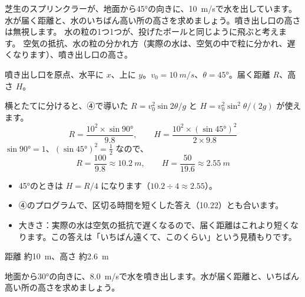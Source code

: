 \begin{phreidai}[スプリンクラーの水]
\label{ph:力-1:ex6}芝生のスプリンクラーが、地面から45°の向きに、\qty{10}{m/s}で水を出しています。水が届く距離と、水のいちばん高い所の高さを求めましょう。噴き出し口の高さは無視します。
\phbamen
水の粒の1つ1つが、投げたボールと同じように飛ぶと考えます。
\phmushi
空気の抵抗、水の粒の分かれ方（実際の水は、空気の中で粒に分かれ、遅くなります）、噴き出し口の高さ。
\phzu
\noindent\begin{minipage}[c]{0.5\linewidth}\centering
{}
\end{minipage}\hfill
\begin{minipage}[c]{0.47\linewidth}
噴き出し口を原点、水平に $x$、上に $y$。$v_0=\qty{10}{m/s}$、$\theta=45°$。届く距離 $R$、高さ $H$。
\end{minipage}
\phriyu
横とたてに分けると、④で導いた $R=v_0^2\sin2\theta/g$ と $H=v_0^2\sin^2\theta/(2g)$ が使えます。
\phtateru
\[ R=\frac{10^2\times\sin90°}{9.8},\qquad H=\frac{10^2\times(\sin45°)^2}{2\times9.8} \]
\phtoku
$\sin90°=1$、$(\sin45°)^2=\tfrac{1}{2}$ なので、
\[ R=\frac{100}{9.8}\approx\qty{10.2}{m},\qquad H=\frac{50}{19.6}\approx\qty{2.55}{m} \]
\phtashikame
\begin{itemize}[leftmargin=1.2\zw, itemsep=1pt, topsep=1pt, label={\color{bkTheme}●}]
\item 45°のときは $H=R/4$ になります（$10.2\div4\approx2.55$）。
\item ④のプログラムで、区切る時間を短くした答え（10.22）とも合います。
\item 大きさ：実際の水は空気の抵抗で遅くなるので、届く距離はこれより短くなります。この答えは「いちばん遠くて、このくらい」という見積もりです。
\end{itemize}
\kotae 距離 約\qty{10}{m}、高さ 約\qty{2.6}{m}
\end{phreidai}
\begin{jibun}
地面から30°の向きに、\qty{8.0}{m/s}で水を噴き出します。水が届く距離と、いちばん高い所の高さを求めましょう。
\end{jibun}

